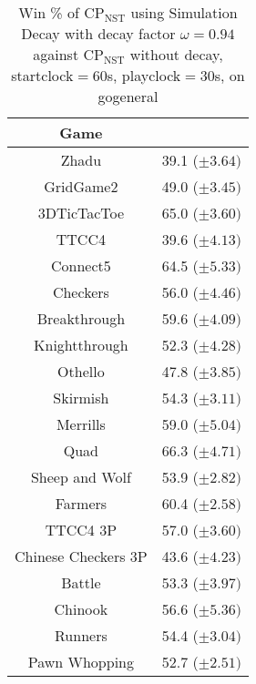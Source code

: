 \documentclass[journal]{IEEEtran}
\begin{document}
\begin{table}[h!]
\caption{Win \% of CP$_{\textrm{NST}}$ using Simulation Decay with decay factor $\omega=0.94$ against CP$_{\textrm{NST}}$ without decay, startclock$=$60s, playclock$=$30s, on gogeneral}
\label{table:simDecay}
\centering
\begin{tabular}{|c|c|}
\hline
 \textbf{Game} & \\
\hline\hline
Zhadu & 39.1 ($\pm 3.64)$  \\ 
GridGame2 & 49.0 ($\pm 3.45)$   \\ 
3DTicTacToe & 65.0 ($\pm 3.60)$   \\ 
TTCC4 & 39.6 ($\pm 4.13)$  \\ 
Connect5 & 64.5 ($\pm 5.33)$   \\ 
Checkers & 56.0 ($\pm 4.46)$    \\ 
Breakthrough & 59.6 ($\pm 4.09)$    \\ 
Knightthrough & 52.3 ($\pm 4.28)$    \\ 
Othello & 47.8 ($\pm 3.85)$    \\ 
Skirmish & 54.3 ($\pm 3.11)$   \\ 
Merrills & 59.0 ($\pm 5.04)$   \\ 
Quad & 66.3 ($\pm 4.71)$ \\ 
Sheep and Wolf & 53.9 ($\pm 2.82)$ \\ 
\hline
Farmers & 60.4 ($\pm 2.58)$  \\ 
TTCC4 3P & 57.0 ($\pm 3.60)$  \\ 
Chinese Checkers 3P & 43.6 ($\pm 4.23)$ \\ 
\hline
Battle & 53.3 ($\pm 3.97)$  \\ 
Chinook & 56.6 ($\pm 5.36)$   \\ 
Runners & 54.4 ($\pm 3.04)$ \\ 
Pawn Whopping & 52.7 ($\pm 2.51)$  \\ \hline
\end{tabular}
\end{table}
\end{document}

